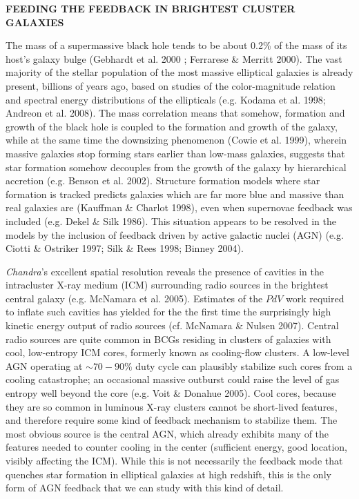 \documentclass[letterpaper,11pt]{article}
\begin{document}
\pagestyle{plain}

\begin{center} 
\bfseries\uppercase{
Feeding the Feedback in Brightest Cluster Galaxies
}
\end{center}


The mass of a supermassive black hole tends to be about 0.2\% of the
mass of its host's galaxy bulge (Gebhardt et al. 2000 ; Ferrarese \&
Merritt 2000). The vast majority of the stellar population of the most
massive elliptical galaxies is already present, billions of years ago,
based on studies of the color-magnitude relation and spectral energy
distributions of the ellipticals (e.g. Kodama et al. 1998; Andreon et
al. 2008). The mass correlation means that somehow, formation and
growth of the black hole is coupled to the formation and growth of the
galaxy, while at the same time the downsizing phenomenon (Cowie et
al. 1999), wherein massive galaxies stop forming stars earlier than
low-mass galaxies, suggests that star formation somehow decouples from
the growth of the galaxy by hierarchical accretion (e.g. Benson et
al. 2002).  Structure formation models where star formation is tracked
predicts galaxies which are far more blue and massive than real
galaxies are (Kauffman \& Charlot 1998), even when supernovae feedback
was included (e.g. Dekel \& Silk 1986). This situation appears to be
resolved in the models by the inclusion of feedback driven by active
galactic nuclei (AGN) (e.g. Ciotti \& Ostriker 1997; Silk \& Rees
1998; Binney 2004).

{\it{Chandra}}'s excellent spatial resolution reveals the presence of
cavities in the intracluster X-ray medium (ICM) surrounding radio
sources in the brightest central galaxy (e.g. McNamara et
al. 2005). Estimates of the $PdV$ work required to inflate such
cavities has yielded for the the first time the surprisingly high
kinetic energy output of radio sources (cf. McNamara \& Nulsen
2007). Central radio sources are quite common in BCGs residing in
clusters of galaxies with cool, low-entropy ICM cores, formerly known
as cooling-flow clusters. A low-level AGN operating at $\sim70-90\%$
duty cycle can plausibly stabilize such cores from a cooling
catastrophe; an occasional massive outburst could raise the level of
gas entropy well beyond the core (e.g. Voit \& Donahue 2005). Cool
cores, because they are so common in luminous X-ray clusters cannot be
short-lived features, and therefore require some kind of feedback
mechanism to stabilize them. The most obvious source is the central
AGN, which already exhibits many of the features needed to counter
cooling in the center (sufficient energy, good location, visibly
affecting the ICM). While this is not necessarily the feedback mode
that quenches star formation in elliptical galaxies at high redshift,
this is the only form of AGN feedback that we can study with this kind
of detail.
\end{document}
